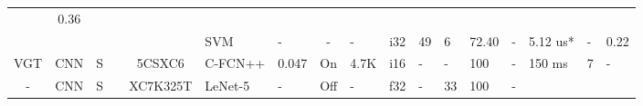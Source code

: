 \documentclass{article}
\begin{document}
\begin{table}
\begin{adjustbox}{totalheight=\baselineskip,}
\begin{tabular}{ccccclp{2em}cp{3em}cp{2em}p{4em}p{3em}p{3.5em}p{3.5em}p{2.5em}p{3em}}
                                                               &\multirow{1}{*}{0.36}\\
   &   &   &   &   &\multirow{1}{*}{SVM}
                       &\multirow{1}{*}{-}
                           &\multirow{1}{*}{-}
                               &\multirow{1}{*}{-}
                                   &\multirow{1}{*}{i32}
                                       &\multirow{1}{*}{49}
                                           &\multirow{1}{*}{6}
                                               &\multirow{1}{*}{72.40}
                                                   &\multirow{1}{*}{-}
                                                       &\multirow{1}{*}{5.12 us*}
                                                           &\multirow{1}{*}{-}
                                                               &\multirow{1}{*}{0.22}\\
\cmidrule{1-17}
\multirow{1}{*}{VGT}
   &\multirow{1}{*}{CNN}
       &\multirow{1}{*}{S}
           &\multirow{1}{*}{\cite{bahlLowpowerNeuralNetworks2019a}}
               &\multirow{1}{*}{5CSXC6}
                   &\multirow{1}{*}{C-FCN++}
                       &\multirow{1}{*}{0.047}
                           &\multirow{1}{*}{On}
                               &\multirow{1}{*}{4.7K}
                                   &\multirow{1}{*}{i16}
                                       &\multirow{1}{*}{-}
                                           &\multirow{1}{*}{-}
                                               &\multirow{1}{*}{100}
                                                   &\multirow{1}{*}{-}
                                                       &\multirow{1}{*}{150 ms}
                                                           &\multirow{1}{*}{7}
                                                               &\multirow{1}{*}{-}\\
\cmidrule{1-17}
\multirow{7}{*}{-}
   &\multirow{5}{*}{CNN}
       &\multirow{1}{*}{S}
           &\multirow{1}{*}{\cite{chenHardwareImplementationConvolutional2020}}
               &\multirow{1}{*}{XC7K325T}
                   &\multirow{1}{*}{LeNet-5}
                       &\multirow{1}{*}{-}
                           &\multirow{1}{*}{Off}
                               &\multirow{1}{*}{-}
                                   &\multirow{1}{*}{f32}
                                       &\multirow{1}{*}{-}
                                           &\multirow{1}{*}{33}
                                               &\multirow{1}{*}{100}
                                                   &\multirow{1}{*}{-}

\end{tabular}
\end{adjustbox}
\end{table}
\end{document}
